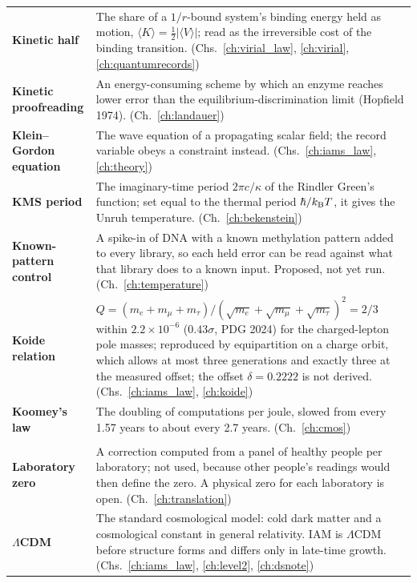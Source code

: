 {\begin{longtable}{@{}>{\raggedright\arraybackslash}p{}>{\raggedright\arraybackslash}p{}@{}}
\textbf{Kinetic half} & The share of a $1/r$-bound system's binding energy held as motion, $\langle K\rangle=\tfrac12|\langle V\rangle|$; read as the irreversible cost of the binding transition. {\footnotesize(Chs.~\ref{ch:virial_law}, \ref{ch:virial}, \ref{ch:quantumrecords})}\\[1pt]
\textbf{Kinetic proofreading} & An energy-consuming scheme by which an enzyme reaches lower error than the equilibrium-discrimination limit (Hopfield 1974). {\footnotesize(Ch.~\ref{ch:landauer})}\\[1pt]
\textbf{Klein--Gordon equation} & The wave equation of a propagating scalar field; the record variable obeys a constraint instead. {\footnotesize(Chs.~\ref{ch:iams_law}, \ref{ch:theory})}\\[1pt]
\textbf{KMS period} & The imaginary-time period $2\pi c/\kappa$ of the Rindler Green's function; set equal to the thermal period $\hbar/k_{\mathrm B} T$, it gives the Unruh temperature. {\footnotesize(Ch.~\ref{ch:bekenstein})}\\[1pt]
\textbf{Known-pattern control} & A spike-in of DNA with a known methylation pattern added to every library, so each held error can be read against what that library does to a known input. Proposed, not yet run. {\footnotesize(Ch.~\ref{ch:temperature})}\\[1pt]
\textbf{Koide relation} & $Q=(m_e+m_\mu+m_\tau)/(\sqrt{m_e}+\sqrt{m_\mu}+\sqrt{m_\tau})^2=2/3$ within $2.2\times10^{-6}$ ($0.43\sigma$, PDG 2024) for the charged-lepton pole masses; reproduced by equipartition on a charge orbit, which allows at most three generations and exactly three at the measured offset; the offset $\delta=0.2222$ is not derived. {\footnotesize(Chs.~\ref{ch:iams_law}, \ref{ch:koide})}\\[1pt]
\textbf{Koomey's law} & The doubling of computations per joule, slowed from every 1.57 years to about every 2.7 years. {\footnotesize(Ch.~\ref{ch:cmos})}\\[1pt]
\multicolumn{2}{@{}l}{\normalsize\textbf{L}}\\[2pt]
\textbf{Laboratory zero} & A correction computed from a panel of healthy people per laboratory; not used, because other people's readings would then define the zero. A physical zero for each laboratory is open. {\footnotesize(Ch.~\ref{ch:translation})}\\[1pt]
\textbf{$\Lambda$CDM} & The standard cosmological model: cold dark matter and a cosmological constant in general relativity. IAM is $\Lambda$CDM before structure forms and differs only in late-time growth. {\footnotesize(Chs.~\ref{ch:iams_law}, \ref{ch:level2}, \ref{ch:dsnote})}\\[1pt]

\end{longtable}}
